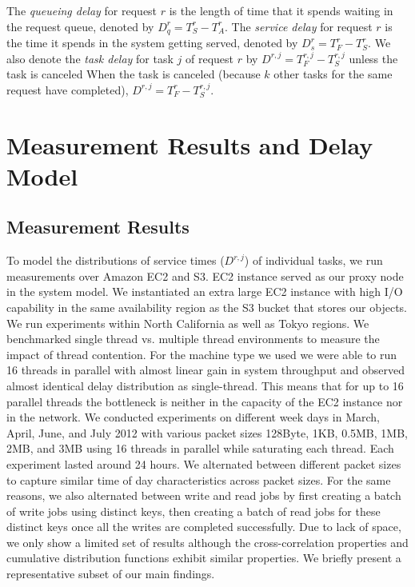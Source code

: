 \documentclass[journal]{IEEEtran}
\begin{document}
The {\em queueing delay} for request $r$ is the length of time that it spends waiting in the request queue, denoted by $D_q^r = T_S^r - T_A^r$. The {\em service delay} for request $r$ is the time it spends in the system getting served, denoted by $D_s^r = T_F^r - T_S^r$. 
We also denote the {\em task delay} for task $j$ of request $r$ by $D^{r,j} = T_F^{r,j} - T_S^{r,j}$ unless the task is canceled When the task is canceled (because $k$ other tasks for the same request have completed), $D^{r,j} = T_F^r - T_S^{r,j}$.


\section{Measurement Results and Delay Model}
\label{sec:measurement}

\subsection{Measurement Results}
To model the distributions of service times ($D^{r,j}$) of individual tasks, we run measurements over Amazon EC2 and S3. EC2 instance served as our proxy node in the system model.  We instantiated an extra large EC2 instance with high I/O capability in the same availability region as the S3 bucket that stores our objects. We run experiments within North California as well as Tokyo regions. We benchmarked single thread vs. multiple thread environments to measure the impact of thread contention. For the machine type we used we were able to run 16 threads in parallel with almost linear gain in system throughput and observed almost identical delay distribution as single-thread. This means that for up to 16 parallel threads the bottleneck is neither in the capacity of the EC2 instance nor in the network. We conducted experiments on different week days in March, April, June, and July 2012 with various packet sizes 128Byte, 1KB, 0.5MB, 1MB, 2MB, and 3MB using 16 threads in parallel while saturating each thread. Each experiment lasted around 24 hours. We alternated between different packet sizes to capture similar time of day characteristics across packet sizes. For the same reasons, we also alternated between write and read jobs by first creating a batch of write jobs using distinct keys, then creating a batch of read jobs for these distinct keys once all the writes are completed successfully. Due to lack of space, we only show a limited set of results although the cross-correlation properties and cumulative distribution functions exhibit similar properties. We briefly present a representative subset of our main findings.  
\end{document}

